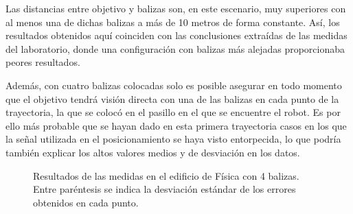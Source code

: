 Las distancias entre objetivo y balizas son, en este escenario, muy superiores con al menos una de dichas balizas a más de 10 metros de forma constante.
Así, los resultados obtenidos aquí coinciden con las conclusiones extraídas de las medidas del laboratorio, donde una configuración con balizas más alejadas proporcionaba peores resultados.

Además, con cuatro balizas colocadas solo es posible asegurar en todo momento que el objetivo tendrá visión directa con una de las balizas en cada punto de la trayectoria, la que se colocó en el pasillo en el que se encuentre el robot.
Es por ello más probable que se hayan dado en esta primera trayectoria casos en los que la señal utilizada en el posicionamiento se haya visto entorpecida, lo que podría también explicar los altos valores medios y de desviación en los datos.

\begin{figure}[H]
    \centering
    
    \caption{Resultados de las medidas en el edificio de Física con 4 balizas. Entre paréntesis se indica la desviación estándar de los errores obtenidos en cada punto.}
    \label{fig:res_fisica_4}
\end{figure}

